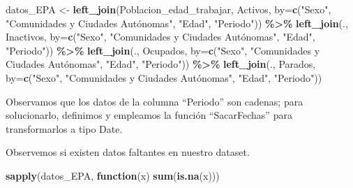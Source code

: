 \documentclass[notspecified,article,submit,moreauthors,pdftex]{Definitions/mdpi}
\newenvironment{Shaded}{\begin{snugshade}}{\end{snugshade}}
\newcommand{\AttributeTok}[1]{\textcolor[rgb]{0.13,0.29,0.53}{#1}}
\newcommand{\ControlFlowTok}[1]{\textcolor[rgb]{0.13,0.29,0.53}{\textbf{#1}}}
\newcommand{\FunctionTok}[1]{\textcolor[rgb]{0.13,0.29,0.53}{\textbf{#1}}}
\newcommand{\NormalTok}[1]{#1}
\newcommand{\OtherTok}[1]{\textcolor[rgb]{0.56,0.35,0.01}{#1}}
\newcommand{\SpecialCharTok}[1]{\textcolor[rgb]{0.81,0.36,0.00}{\textbf{#1}}}
\newcommand{\StringTok}[1]{\textcolor[rgb]{0.31,0.60,0.02}{#1}}
\begin{document}
\begin{Shaded}
\begin{Highlighting}[]
\NormalTok{datos\_EPA }\OtherTok{\textless{}{-}} \FunctionTok{left\_join}\NormalTok{(Poblacion\_edad\_trabajar, Activos, }
      \AttributeTok{by=}\FunctionTok{c}\NormalTok{(}\StringTok{"Sexo"}\NormalTok{, }\StringTok{"Comunidades y Ciudades Autónomas"}\NormalTok{, }\StringTok{"Edad"}\NormalTok{, }\StringTok{"Periodo"}\NormalTok{)) }\SpecialCharTok{\%\textgreater{}\%}
                \FunctionTok{left\_join}\NormalTok{(., Inactivos, }
      \AttributeTok{by=}\FunctionTok{c}\NormalTok{(}\StringTok{"Sexo"}\NormalTok{, }\StringTok{"Comunidades y Ciudades Autónomas"}\NormalTok{, }\StringTok{"Edad"}\NormalTok{, }\StringTok{"Periodo"}\NormalTok{)) }\SpecialCharTok{\%\textgreater{}\%}
                \FunctionTok{left\_join}\NormalTok{(., Ocupados, }
      \AttributeTok{by=}\FunctionTok{c}\NormalTok{(}\StringTok{"Sexo"}\NormalTok{, }\StringTok{"Comunidades y Ciudades Autónomas"}\NormalTok{, }\StringTok{"Edad"}\NormalTok{, }\StringTok{"Periodo"}\NormalTok{)) }\SpecialCharTok{\%\textgreater{}\%}
                \FunctionTok{left\_join}\NormalTok{(., Parados, }
      \AttributeTok{by=}\FunctionTok{c}\NormalTok{(}\StringTok{"Sexo"}\NormalTok{, }\StringTok{"Comunidades y Ciudades Autónomas"}\NormalTok{, }\StringTok{"Edad"}\NormalTok{, }\StringTok{"Periodo"}\NormalTok{))}
\end{Highlighting}
\end{Shaded}

Observamos que los datos de la columna ``Periodo'' son cadenas; para
solucionarlo, definimos y empleamos la función ``SacarFechas'' para
transformarlos a tipo Date.

\begin{Shaded}
\end{Shaded}

Observemos si existen datos faltantes en nuestro dataset.

\begin{Shaded}
\begin{Highlighting}[]
\FunctionTok{sapply}\NormalTok{(datos\_EPA, }\ControlFlowTok{function}\NormalTok{(x) }\FunctionTok{sum}\NormalTok{(}\FunctionTok{is.na}\NormalTok{(x)))}
\end{Highlighting}
\end{Shaded}
\end{document}
